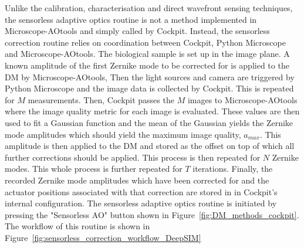 Unlike the calibration, characterisation and direct wavefront sensing techniques, the sensorless adaptive optics routine is not a method implemented in Microscope-AOtools and simply called by Cockpit. Instead, the sensorless correction routine relies on coordination between Cockpit, Python Microscope and Microscope-AOtools. The biological sample is set up in the image plane. A known amplitude of the first Zernike mode to be corrected for is applied to the DM by Microscope-AOtools, Then the light sources and camera are triggered by Python Microscope and the image data is collected by Cockpit. This is repeated for $M$ measurements. Then, Cockpit passes the $M$ images to Microscope-AOtools where the image quality metric for each image is evaluated. These values are then used to fit a Gaussian function and the mean of the Gaussian yields the Zernike mode amplitudes which should yield the maximum image quality, $a_{max}$. This amplitude is then applied to the DM and stored as the offset on top of which all further corrections should be applied. This process is then repeated for $N$ Zernike modes. This whole process is further repeated for $T$ iterations. Finally, the recorded Zernike mode amplitudes which have been corrected for and the actuator positions associated with that correction are stored in in Cockpit's internal configuration. The sensorless adaptive optics routine is initiated by pressing the "Sensorless AO" button shown in Figure~\ref{fig:DM_methods_cockpit}. The workflow of this routine is shown in Figure~\ref{fig:sensorless_correction_workflow_DeepSIM}

